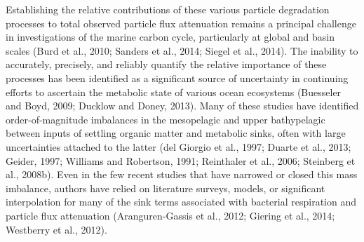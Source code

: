 Establishing the relative contributions of these various particle degradation processes to total observed particle flux attenuation remains a principal challenge in investigations of the marine carbon cycle, particularly at global and basin scales (Burd et al., 2010; Sanders et al., 2014; Siegel et al., 2014). The inability to accurately, precisely, and reliably quantify the relative importance of these processes has been identified as a significant source of uncertainty in continuing efforts to ascertain the metabolic state of various ocean ecosystems (Buesseler and Boyd, 2009; Ducklow and Doney, 2013). Many of these studies have identified order-of-magnitude imbalances in the mesopelagic and upper bathypelagic between inputs of settling organic matter and metabolic sinks, often with large uncertainties attached to the latter (del Giorgio et al., 1997; Duarte et al., 2013; Geider, 1997; Williams and Robertson, 1991; Reinthaler et al., 2006; Steinberg et al., 2008b). Even in the few recent studies that have narrowed or closed this mass imbalance, authors have relied on literature surveys, models, or significant interpolation for many of the sink terms associated with bacterial respiration and particle flux attenuation (Aranguren-Gassis et al., 2012; Giering et al., 2014; Westberry et al., 2012).

